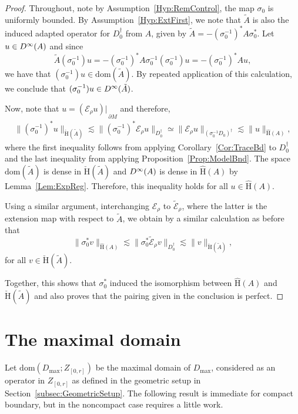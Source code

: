 \documentclass[a4paper,10pt,reqno]{amsart}
\newcommand{\rest}[1]{{{\lvert_{}}_{}}_{#1}}
\newcommand{\norm}[1]{\| #1 \|}%
\newcommand{\Dk}[2][{}]{{\rm D}^{#2}_{\rm #1}}%
\newcommand{\checkH}{\check{\mathrm{H}}}
\newcommand{\hatH}{\hat{\mathrm{H}}}
\newcommand{\dom}{\mathrm{dom}}
\newcommand{\ext}{\mathcal{E}}
\newcommand{\dM}{\partial M}
\theoremstyle{definition}
\begin{document}
\begin{proof}
Throughout, note by Assumption~\ref{Hyp:RemControl}, the map $\sigma_0$ is uniformly bounded.
By Assumption~\ref{Hyp:ExtFirst}, we note that $\tilde{A}$ is also the induced adapted operator for $D_0^\dagger$ from $A$, given by $\tilde{A} = -(\sigma_0^{-1})^\ast A \sigma_0^\ast$.
Let $u \in \Dk{\infty}(A)$ and since
$$\tilde{A} (\sigma_0^{-1})u  = -(\sigma_0^{-1})^\ast A \sigma_0^{-1}(\sigma_0^{-1})u = -(\sigma_0^{-1})^\ast A u,$$
we have that $(\sigma_0^{-1})u \in \dom(\tilde{A})$.
By repeated application of this calculation, we conclude that $(\sigma_0^{-1})u \in \Dk{\infty}(\tilde{A})$.

Now, note that $u = (\ext_{\rho} u)\rest{\dM}$ and therefore,
\begin{align*}
\norm{(\sigma_0^{-1})^\ast u}_{\checkH(\tilde{A})}
\lesssim \norm{(\sigma_0^{-1})^\ast \ext_{\rho} u}_{D_0^\dagger}
\simeq \norm{\ext_{\rho} u}_{(\sigma_0^{-1} D_0)^\dagger}
\lesssim \norm{u}_{\hatH(A)},
\end{align*}
where the first inequality follows from applying Corollary~\ref{Cor:TraceBd} to $D_0^\dagger$ and the last inequality from applying Proposition~\ref{Prop:ModelBnd}.
The space $\dom(\tilde{A})$ is dense in $\checkH(\tilde{A})$ and $\Dk{\infty}(A)$ is dense in $\hatH(A)$ by Lemma~\ref{Lem:ExpReg}.
Therefore, this inequality holds for all $u \in \hatH(A)$.

Using a similar argument, interchanging $\ext_\rho$ to $\tilde{\ext}_\rho$, where the latter is the extension map with respect to $\tilde{A}$, we obtain by a similar calculation as before that
$$ \norm{\sigma_0^\ast v}_{\hatH(A)} \lesssim \norm{\sigma_0^\ast \tilde{\ext}_{\rho} v}_{D_0^\dagger} \lesssim \norm{v}_{\checkH(\tilde{A})},$$
for all $v \in \checkH(\tilde{A})$.

Together, this shows that $\sigma_0^\ast$ induced the isomorphism between $\hatH(A)$ and $\checkH(\tilde{A})$ and also proves that the pairing given in the conclusion is perfect.
\end{proof}


\section{The maximal domain}

Let $\dom(D_{\max}; Z_{[0,r]})$ be the maximal domain of $D_{\max}$, considered as an operator in $Z_{[0,r]}$ as defined in the geometric setup in Section~\ref{subsec:GeometricSetup}.
The following result is immediate for compact boundary, but in the noncompact case requires a little work.
\end{document}
